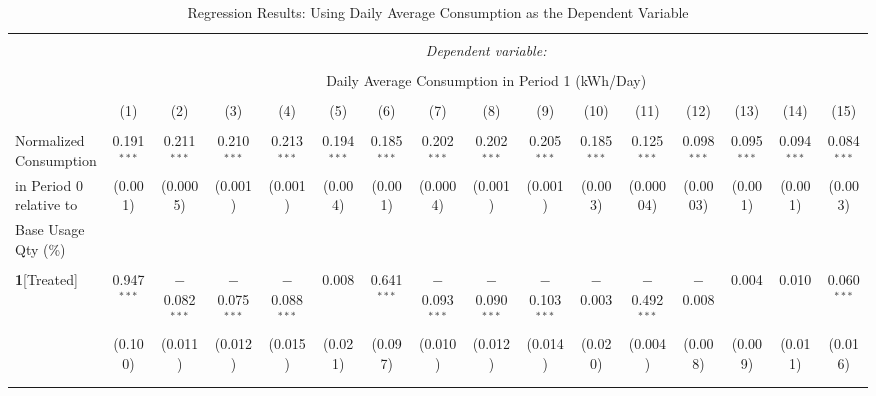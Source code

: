 \begin{table}[!htbp] \centering 
\caption{Regression Results: Using Daily Average Consumption as the Dependent Variable} 
\label{Table:Regression-Results_Daily-Monthly} 
\small 

\begin{adjustbox}{scale = 0.8}

\begin{tabular}{@{\extracolsep{-7pt}}lccccccccccccccc} 
\\[-1.8ex]\hline 
\hline \\[-1.8ex] 
 & \multicolumn{15}{c}{\textit{Dependent variable:}} \\ 
\cline{2-16} 
\\[-1.8ex] & \multicolumn{15}{c}{Daily Average Consumption in Period 1 (kWh/Day)} \\ 
\\[-1.8ex] & (1) & (2) & (3) & (4) & (5) & (6) & (7) & (8) & (9) & (10) & (11) & (12) & (13) & (14) & (15)\\ 
\hline \\[-1.8ex] 
 Normalized Consumption & 0.191$^{***}$ & 0.211$^{***}$ & 0.210$^{***}$ & 0.213$^{***}$ & 0.194$^{***}$ & 0.185$^{***}$ & 0.202$^{***}$ & 0.202$^{***}$ & 0.205$^{***}$ & 0.185$^{***}$ & 0.125$^{***}$ & 0.098$^{***}$ & 0.095$^{***}$ & 0.094$^{***}$ & 0.084$^{***}$ \\ 
 in Period 0 relative to  & (0.001) & (0.0005) & (0.001) & (0.001) & (0.004) & (0.001) & (0.0004) & (0.001) & (0.001) & (0.003) & (0.00004) & (0.0003) & (0.001) & (0.001) & (0.003) \\ 
 Base Usage Qty (\%) & & & & & & & & & & & & & & & \\
  & & & & & & & & & & & & & & & \\ 
 \textbf{1}[Treated] & 0.947$^{***}$ & $-$0.082$^{***}$ & $-$0.075$^{***}$ & $-$0.088$^{***}$ & 0.008 & 0.641$^{***}$ & $-$0.093$^{***}$ & $-$0.090$^{***}$ & $-$0.103$^{***}$ & $-$0.003 & $-$0.492$^{***}$ & $-$0.008 & 0.004 & 0.010 & 0.060$^{***}$ \\ 
  & (0.100) & (0.011) & (0.012) & (0.015) & (0.021) & (0.097) & (0.010) & (0.012) & (0.014) & (0.020) & (0.004) & (0.008) & (0.009) & (0.011) & (0.016) \\ 
  & & & & & & & & & & & & & & & \\
  & & & & & & & & & & & & & & & \\  

\end{tabular}
\end{adjustbox}
\end{table}
